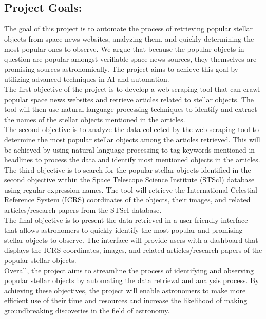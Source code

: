 \documentclass[12pt,letterpaper]{article}
\begin{document}
\\

\\

\subsection*{Project Goals:}
\quad The goal of this project is to automate the process of retrieving popular stellar objects 
from space news websites, analyzing them, and quickly determining the most popular ones to 
observe. We argue that because the popular objects in question are popular amongst
verifiable space news sources, they themselves are promising sources astronomically. 
The project aims to achieve this goal by utilizing advanced techniques in AI and 
automation.\\

\quad The first objective of the project is to develop a web scraping tool that can 
crawl popular space news websites and retrieve articles related to stellar objects. 
The tool will then use natural language processing techniques to identify and extract 
the names of the stellar objects mentioned in the articles.\\

\quad The second objective is to analyze the data collected by the web scraping tool 
to determine the most popular stellar objects among the articles retrieved. This 
will be achieved by using natural language processing to tag keywords mentioned 
in headlines to process the data and identify most mentioned objects in the articles.\\

\quad The third objective is to search for the popular stellar objects identified in 
the second objective within the Space Telescope Science Institute (STScI) database 
using regular expression names. The tool will retrieve the  International 
Celestial Reference System (ICRS) coordinates of the objects, their images, 
and related articles/research papers from the STScI database.\\

\quad The final objective is to present the data retrieved in a user-friendly interface 
that allows astronomers to quickly identify the most popular and promising stellar 
objects to observe. The interface will provide users with a dashboard that displays 
the ICRS coordinates, images, and related articles/research papers of the popular 
stellar objects.\\

\quad Overall, the project aims to streamline the process of identifying and observing 
popular stellar objects by automating the data retrieval and analysis process. 
By achieving these objectives, the project will enable astronomers to make more 
efficient use of their time and resources and increase the likelihood of making 
groundbreaking discoveries in the field of astronomy.\\

\medskip
\printbibliography
\end{document}
